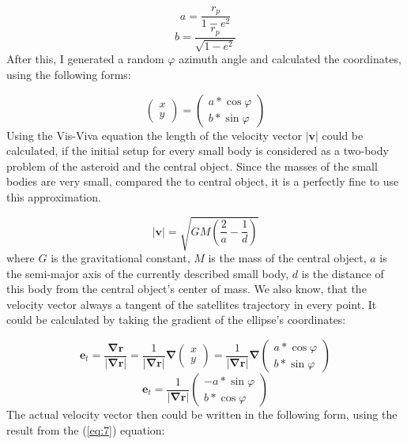 \begin{multicols}{2}
\begin{equation} \label{eq:4}
a = \frac{r_{p}}{1 - e^2}
\end{equation}
\begin{equation} \label{eq:5}
b = \frac{r_{p}}{\sqrt{1 - e^2}}
\end{equation}
After this, I generated a random $\varphi$ azimuth angle and calculated the coordinates, using the following forms:

\begin{equation} \label{eq:6}
\begin{pmatrix}
x \\
y
\end{pmatrix}
=
\begin{pmatrix}
a * \cos{\varphi} \\
b * \sin{\varphi}
\end{pmatrix}
\end{equation}
Using the Vis-Viva equation the length of the velocity vector $\left| \boldsymbol{v} \right|$ could be calculated, if the initial setup for every small body is considered as a two-body problem of the asteroid and the central object. Since the masses of the small bodies are very small, compared the to central object, it is a perfectly fine to use this approximation.

\begin{equation} \label{eq:7}
\left| \boldsymbol{v} \right|
=
\sqrt{GM \left( \frac{2}{a} - \frac{1}{d} \right)}
\end{equation}
where $G$ is the gravitational constant, $M$ is the mass of the central object, $a$ is the semi-major axis of the currently described small body, $d$ is the distance of this body from the central object's center of mass. We also know, that the velocity vector always a tangent of the satellites trajectory in every point. It could be calculated by taking the gradient of the ellipse's coordinates:

\begin{equation} \label{eq:8}
\boldsymbol{e}_{t}
=
\frac{\boldsymbol{\nabla} \boldsymbol{r}}{\left| \boldsymbol{\nabla} \boldsymbol{r} \right|}
=
\frac{1}{\left| \boldsymbol{\nabla} \boldsymbol{r} \right|}
\boldsymbol{\nabla}
\begin{pmatrix}
x \\
y
\end{pmatrix}
=
\frac{1}{\left| \boldsymbol{\nabla} \boldsymbol{r} \right|}
\boldsymbol{\nabla}
\begin{pmatrix}
a * \cos{\varphi} \\
b * \sin{\varphi}
\end{pmatrix}
\end{equation}
\begin{equation} \label{eq:9}
\boldsymbol{e}_{t}
=
\frac{1}{\left| \boldsymbol{\nabla} \boldsymbol{r} \right|}
\begin{pmatrix}
-a * \sin{\varphi} \\
b * \cos{\varphi}
\end{pmatrix}
\end{equation}
The actual velocity vector then could be written in the following form, using the result from the (\ref{eq:7}) equation:


\end{multicols}
